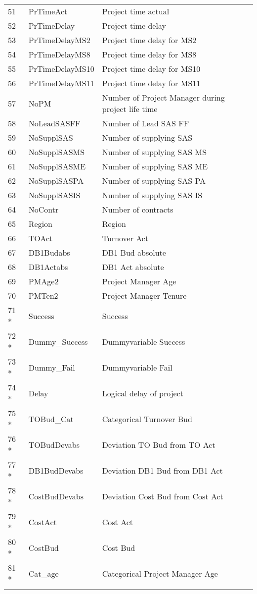 \begin{longtable}[ht]{p{} p{}p{}}
51    & PrTimeAct & Project time actual \\
52    & PrTimeDelay & Project time delay \\
53    & PrTimeDelayMS2 & Project time delay for MS2 \\
54    & PrTimeDelayMS8 & Project time delay for MS8 \\
55    & PrTimeDelayMS10 & Project time delay for MS10 \\
56    & PrTimeDelayMS11 & Project time delay for MS11 \\
57    & NoPM  & Number of Project Manager during project life time \\
58    & NoLeadSASFF & Number of Lead SAS FF \\
59    & NoSupplSAS & Number of supplying SAS \\
60    & NoSupplSASMS & Number of supplying SAS MS \\
61    & NoSupplSASME & Number of supplying SAS ME \\
62    & NoSupplSASPA & Number of supplying SAS PA \\
63    & NoSupplSASIS & Number of supplying SAS IS \\
64    & NoContr & Number of contracts \\
65    & Region & Region \\
66    & TOAct & Turnover Act \\
67    & DB1Budabs & DB1 Bud absolute \\
68    & DB1Actabs & DB1 Act absolute \\
69    & PMAge2 & Project Manager Age \\
70    & PMTen2 & Project Manager Tenure \\
71 *   & Success & Success \\
72 *  & Dummy\_Success & Dummyvariable Success \\
73 *   & Dummy\_Fail & Dummyvariable Fail \\
74 *   & Delay & Logical delay of project \\
75 *   & TOBud\_Cat & Categorical Turnover Bud \\
76 *   & TOBudDevabs & Deviation TO Bud from TO Act \\
77 *   & DB1BudDevabs & Deviation DB1 Bud from DB1 Act \\
78 *   & CostBudDevabs & Deviation Cost Bud from Cost Act \\
79 *   & CostAct & Cost Act \\
80 *   & CostBud & Cost Bud \\
81 *   & Cat\_age & Categorical Project Manager Age \\
	\label{tab:addlabel}%
\end{longtable}%

